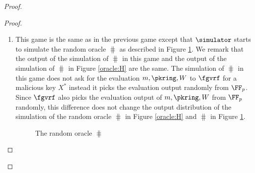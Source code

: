 \begin{proof}
\begin{proof}
\begin{enumerate}[label={{Game} }{{\arabic*}}, start = 0]
			
			
			\item \label{game:gdh}This game is the same as in the previous game except that $ \simulator $ starts to simulate the random oracle $ \hash $ as described in Figure \ref{oracle:Hgame}. We remark that the output of the simulation of $ \hash $ in this game and the output of the simulation of $ \hash $ in Figure \ref{oracle:H} are the same. The simulation of $ \hash $ in this game does not ask for the evaluation $ m, \pkring, W $ to $ \fgvrf $ for a malicious key $ X^* $ instead it picks the evaluation output randomly from $ \FF_p $. Since  $ \fgvrf $ also picks the evaluation output of $ m, \pkring, W $ from $ \FF_p $ randomly, this difference does not change the output distribution of the simulation of the random oracle $ \hash $ in Figure \ref{oracle:H} and $ \hash $ in Figure \ref{oracle:Hgame}.
			
				\begin{figure}
				\centering
				
				\noindent{}	
				\caption{The random oracle $ \hash $}
				\label{oracle:Hgame}
			\end{figure}
			

\end{enumerate}
\end{proof}
\end{proof}
